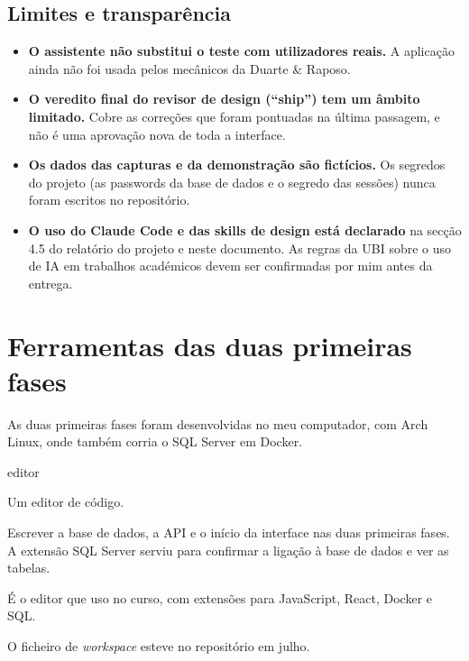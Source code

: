 \documentclass[a4paper,12pt]{article}
\newenvironment{ficha}[2]{%
  \par\needspace{7\baselineskip}\medskip\noindent{\large\bfseries #1}\hfill{\small\color{gray!70!black}#2}\par\nopagebreak\smallskip
  \begin{description}[leftmargin=3.1cm,labelwidth=2.8cm,labelsep=0.3cm,font=\normalfont\bfseries\small,itemsep=2pt,topsep=2pt,before=\raggedright]
}{\end{description}\medskip}
\begin{document}
\subsection{Limites e transparência}

\begin{itemize}
  \item \textbf{O assistente não substitui o teste com utilizadores reais.} A aplicação ainda não foi usada pelos mecânicos da Duarte \& Raposo.
  \item \textbf{O veredito final do revisor de design (``ship'') tem um âmbito limitado.} Cobre as correções que foram pontuadas na última passagem, e não é uma aprovação nova de toda a interface.
  \item \textbf{Os dados das capturas e da demonstração são fictícios.} Os segredos do projeto (as passwords da base de dados e o segredo das sessões) nunca foram escritos no repositório.
  \item \textbf{O uso do Claude Code e das skills de design está declarado} na secção 4.5 do relatório do projeto e neste documento. As regras da UBI sobre o uso de IA em trabalhos académicos devem ser confirmadas por mim antes da entrega.
\end{itemize}

\section{Ferramentas das duas primeiras fases}

As duas primeiras fases foram desenvolvidas no meu computador, com Arch Linux, onde também corria o SQL Server em Docker.

\begin{ficha}{Visual Studio Code}{editor}
  \item[O que é] Um editor de código.
  \item[Para que serviu] Escrever a base de dados, a API e o início da interface nas duas primeiras fases. A extensão SQL Server serviu para confirmar a ligação à base de dados e ver as tabelas.
  \item[Porquê] É o editor que uso no curso, com extensões para JavaScript, React, Docker e SQL.
  \item[Onde está] O ficheiro de \textit{workspace} esteve no repositório em julho.
\end{ficha}
\end{document}
